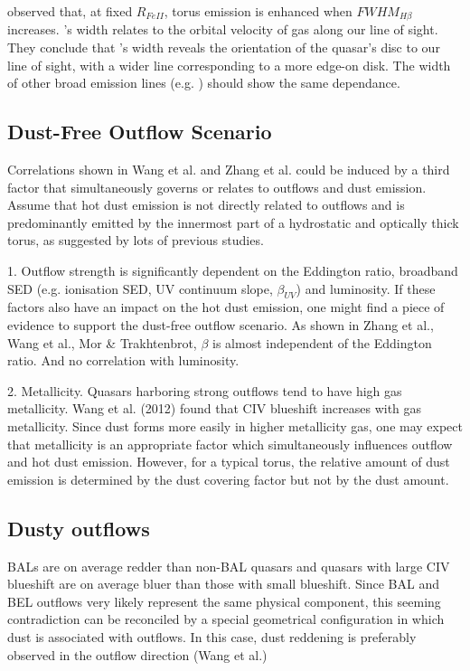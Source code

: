 \citet{shen14} observed that, at fixed $R_{FeII}$, torus emission is enhanced when $FWHM_{H\beta}$ increases. 
\hbns’s width relates to the orbital velocity of gas along our line of sight. 
They conclude that \hbns's width reveals the orientation of the quasar's disc to our line of sight, with a wider line corresponding to a more edge-on disk. 
The width of other broad emission lines (e.g. ) should show the same dependance.   

\subsection{Dust-Free Outflow Scenario}

Correlations shown in Wang et al. and Zhang et al. could be induced by a third factor that simultaneously governs or relates to outflows and dust emission. 
Assume that hot dust emission is not directly related to outflows and is predominantly emitted by the innermost part of a hydrostatic and optically thick torus, as suggested by lots of previous studies.

1. Outflow strength is significantly dependent on the Eddington ratio, broadband SED (e.g. ionisation SED, UV continuum slope, $\beta_{UV}$) and luminosity. 
If these factors also have an impact on the hot dust emission, one might find a piece of evidence to support the dust-free outflow scenario. 
As shown in Zhang et al., Wang et al., Mor \& Trakhtenbrot, $\beta$ is almost independent of the Eddington ratio. And no correlation with luminosity. 

2. Metallicity. Quasars harboring strong outflows tend to have high gas metallicity. 
Wang et al. (2012) found that CIV blueshift increases with gas metallicity. 
Since dust forms more easily in higher metallicity gas, one may expect that metallicity is an appropriate factor which simultaneously influences outflow and hot dust emission. 
However, for a typical torus, the relative amount of dust emission is determined by the dust covering factor but not by the dust amount. 

\subsection{Dusty outflows}

BALs are on average redder than non-BAL quasars and quasars with large CIV blueshift are on average bluer than those with small blueshift. 
Since BAL and BEL outflows very likely represent the same physical component, this seeming contradiction can be reconciled by a special geometrical configuration in which dust is associated with outflows. 
In this case, dust reddening is preferably observed in the outflow direction (Wang et al.) 

